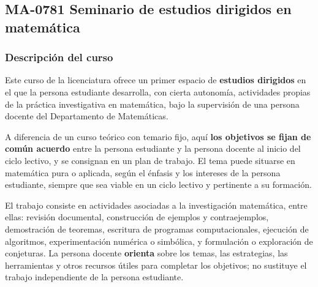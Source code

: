 \newpage
\subsection*{MA-0781 Seminario de estudios dirigidos en matemática}

\hypertarget{MA0781SED}{}
\begin{refsection}
\begin{table}[H]
\end{table}

\subsubsection*{Descripción del curso}

Este curso de la licenciatura ofrece un primer espacio de \textbf{estudios dirigidos} en el que la persona estudiante desarrolla, con cierta autonomía, actividades propias de la práctica investigativa en matemática, bajo la supervisión de una persona docente del Departamento de Matemáticas.

A diferencia de un curso teórico con temario fijo, aquí \textbf{los objetivos se fijan de común acuerdo} entre la persona estudiante y la persona docente al inicio del ciclo lectivo, y se consignan en un plan de trabajo. El tema puede situarse en matemática pura o aplicada, según el énfasis y los intereses de la persona estudiante, siempre que sea viable en un ciclo lectivo y pertinente a su formación.

El trabajo consiste en actividades asociadas a la investigación matemática, entre ellas: revisión documental, construcción de ejemplos y contraejemplos, demostración de teoremas, escritura de programas computacionales, ejecución de algoritmos, experimentación numérica o simbólica, y formulación o exploración de conjeturas. La persona docente \textbf{orienta} sobre los temas, las estrategias, las herramientas y otros recursos útiles para completar los objetivos; no sustituye el trabajo independiente de la persona estudiante.


\end{refsection}
